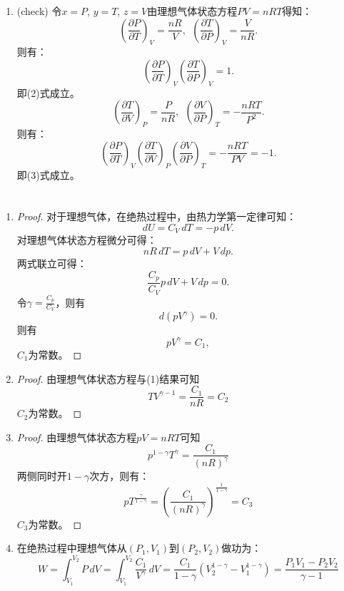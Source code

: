 \documentclass[reqno,a4paper,12pt]{amsart}
\begin{document}
\begin{enumerate}
	\item (check) 令$x = P$, $y = T$, $z = V$由理想气体状态方程$PV = nRT$得知：
	\[
		\left( \frac{\partial P}{\partial T} \right)_V = \frac{nR}{V},~~ \left( \frac{\partial T}{\partial P} \right)_V = \frac{V}{nR}.
	\]
	则有：
	\[
		\left( \frac{\partial P}{\partial T} \right)_V \left( \frac{\partial T}{\partial P} \right)_V = 1.
	\]
	即(2)式成立。
	\[
		\left( \frac{\partial T}{\partial V} \right)_P = \frac{P}{nR}, ~~ \left( \frac{\partial V}{\partial P} \right)_T = -\frac{nRT}{P^2}.
	\]
	则有：
	\[
		\left( \frac{\partial P}{\partial T} \right)_V \left( \frac{\partial T}{\partial V} \right)_P \left( \frac{\partial V}{\partial P} \right)_T = -\frac{nRT}{PV} = -1.
	\]
	即(3)式成立。

\end{enumerate}

\section{}
\begin{enumerate}
	\item
	\begin{proof}
		对于理想气体，在绝热过程中，由热力学第一定律可知：
		\[
			dU = C_V\,dT = -p\,dV.
		\]
		对理想气体状态方程微分可得：
		\[
			nR\,dT = p\,dV + V\,dp.
		\]
		两式联立可得：
		\[
			\frac{C_p}{C_V} p\,dV + V\,dp = 0.
		\]
		令$\gamma = \frac{C_p}{C_V}$，则有
		\[
			d\left( pV^\gamma \right) = 0.
		\]
		则有
		\[
			pV^\gamma = C_1,
		\]$C_1$为常数。
	\end{proof}
	
	\item
	\begin{proof}
		由理想气体状态方程与(1)结果可知
		\[
			TV^{\gamma-1} = \frac{C_1}{nR} = C_2
		\]
		$C_2$为常数。
	\end{proof}
	
	\item
	\begin{proof}
		由理想气体状态方程$pV = nRT$可知
		\[
			p^{1-\gamma}T^{\gamma} = \frac{C_1}{(nR)^{\gamma}}
		\]
		两侧同时开$1-\gamma$次方，则有：
		\[
			pT^{\frac{\gamma}{1-\gamma}} = \left( \frac{C_1}{(nR)^{\gamma}} \right)^{\frac{1}{1-\gamma}} = C_3
		\]
		$C_3$为常数。
	\end{proof}
	
	\item 在绝热过程中理想气体从$(P_1, V_1)$到$(P_2, V_2)$做功为：
	\[
		W = \int_{V_1}^{V_2} P\,dV = \int_{V_1}^{V_2} \frac{C_1}{V^{\gamma}}\,dV = \frac{C_1}{1-\gamma} \left( V_2^{1-\gamma} - V_1^{1-\gamma} \right) = \frac{P_1V_1-P_2V_2}{\gamma-1}
	\]

\end{enumerate}
\end{document}
